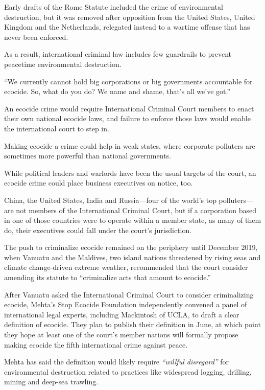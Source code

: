 \documentclass[
]{book}
\begin{document}
Early drafts of the Rome Statute included the crime of environmental destruction, but it was removed after opposition from the United States, United Kingdom and the Netherlands, relegated instead to a wartime offense that has never been enforced.

As a result, international criminal law includes few guardrails to prevent peacetime environmental destruction.

``We currently cannot hold big corporations or big governments accountable for ecocide. So, what do you do? We name and shame, that's all we've got.''

An ecocide crime would require International Criminal Court members to enact their own national ecocide laws, and failure to enforce those laws would enable the international court to step in.

Making ecocide a crime could help in weak states, where corporate polluters are sometimes more powerful than national governments.

While political leaders and warlords have been the usual targets of the court, an ecocide crime could place business executives on notice, too.

China, the United States, India and Russia---four of the world's top polluters---are not members of the International Criminal Court, but if a corporation based in one of those countries were to operate within a member state, as many of them do, their executives could fall under the court's jurisdiction.

The push to criminalize ecocide remained on the periphery until December 2019, when Vanuatu and the Maldives, two island nations threatened by rising seas and climate change-driven extreme weather, recommended that the court consider amending its statute to ``criminalize acts that amount to ecocide.''

After Vanuatu asked the International Criminal Court to consider criminalizing ecocide, Mehta's Stop Ecocide Foundation independently convened a panel of international legal experts, including Mackintosh of UCLA, to draft a clear definition of ecocide. They plan to publish their definition in June, at which point they hope at least one of the court's member nations will formally propose making ecocide the fifth international crime against peace.

Mehta has said the definition would likely require \emph{``willful disregard''} for environmental destruction related to practices like widespread logging, drilling, mining and deep-sea trawling.
\end{document}
